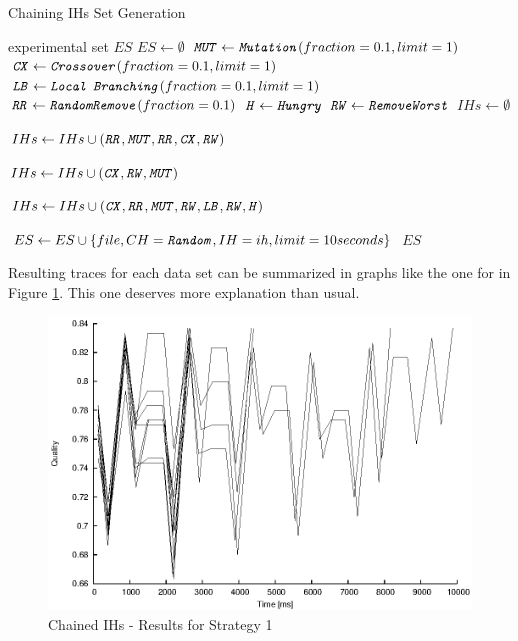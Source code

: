 \begin{algorithm}
\caption{Chaining IHs Set Generation}
\label{listing-experiment-chaining-ihs}
\begin{algorithmic}
\ENSURE experimental set $ES$
\STATE $ES \gets \emptyset$
\STATE $\texttt{\textit{MUT}} \gets \texttt{\textit{Mutation}}(fraction = 0.1, limit = 1)$
\STATE $\texttt{\textit{CX}} \gets \texttt{\textit{Crossover}}(fraction = 0.1, limit = 1)$
\STATE $\texttt{\textit{LB}} \gets \texttt{\textit{Local Branching}}(fraction = 0.1, limit = 1)$
\STATE $\texttt{\textit{RR}} \gets \texttt{\textit{RandomRemove}}(fraction = 0.1)$
\STATE $\texttt{\textit{H}} \gets \texttt{\textit{Hungry}}$
\STATE $\texttt{\textit{RW}} \gets \texttt{\textit{RemoveWorst}}$
\STATE $IHs \gets \emptyset$

\STATE $IHs \gets IHs \cup (\texttt{\textit{RR}}, \texttt{\textit{MUT}}, \texttt{\textit{RR}}, \texttt{\textit{CX}}, \texttt{\textit{RW}})$

\STATE $IHs \gets IHs \cup (\texttt{\textit{CX}}, \texttt{\textit{RW}}, \texttt{\textit{MUT}})$

\STATE $IHs \gets IHs \cup (\texttt{\textit{CX}}, \texttt{\textit{RR}}, \texttt{\textit{MUT}}, \texttt{\textit{RW}}, \texttt{\textit{LB}}, \texttt{\textit{RW}}, \texttt{\textit{H}})$

      \STATE $ES \gets ES \cup \{file, CH = \texttt{\textit{Random}}, IH = ih, limit = 10 seconds\}$
    \ENDFOR
  \ENDFOR
\ENDFOR
\RETURN $ES$
\end{algorithmic}
\end{algorithm}

Resulting traces for each data set can be summarized in graphs like the one for  in Figure \ref{image-experiment-chained-ihs-s1}. This one deserves more explanation than usual.

\begin{figure}
  \caption{Chained IHs -  Results for Strategy 1}
  \label{image-experiment-chained-ihs-s1}
  \centering
    \includegraphics[width=\textwidth]{images/experiments/chained-ihs-s1}
\end{figure}

